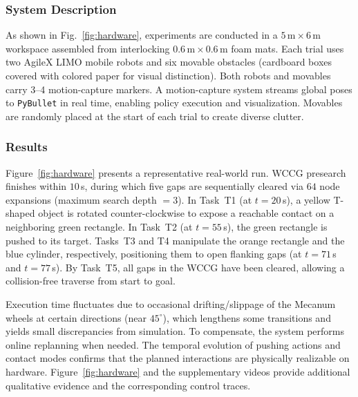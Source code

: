 \subsubsection{System Description}\label{subsec:exp-description}
As shown in Fig.~\ref{fig:hardware},
experiments are conducted in a $5\,\mathrm{m}\times6\,\mathrm{m}$ workspace assembled from interlocking $0.6\,\mathrm{m}\times0.6\,\mathrm{m}$ foam mats.
Each trial uses two AgileX LIMO mobile robots and six movable obstacles (cardboard boxes covered with colored paper for visual distinction).
Both robots and movables carry 3--4 motion-capture markers.
A motion-capture system streams global poses to \texttt{PyBullet} in real time, enabling policy execution and visualization.
Movables are randomly placed at the start of each trial to create diverse clutter.

\subsubsection{Results}\label{subsec:exp-results}
Figure~\ref{fig:hardware} presents a representative real-world run.
WCCG presearch finishes within $10$\,s, during which five gaps are sequentially cleared via $64$ node expansions (maximum search depth $=3$).
In Task~T1 (at $t{=}20$\,s), a yellow T-shaped object is rotated counter-clockwise to expose a reachable contact on a neighboring green rectangle.
In Task~T2 (at $t{=}55$\,s), the green rectangle is pushed to its target.
Tasks~T3 and T4 manipulate the orange rectangle and the blue cylinder, respectively, positioning them to open flanking gaps (at $t{=}71$\,s and $t{=}77$\,s).
By Task~T5, all gaps in the WCCG have been cleared, allowing a collision-free traverse from start to goal.

Execution time fluctuates due to occasional drifting/slippage of the Mecanum wheels at certain directions (near $45^\circ$), which lengthens some transitions and yields small discrepancies from simulation.
To compensate, the system performs online replanning when needed.
The temporal evolution of pushing actions and contact modes confirms that the planned interactions are physically realizable on hardware.
Figure~\ref{fig:hardware} and the supplementary videos provide additional qualitative evidence and the corresponding control traces.


